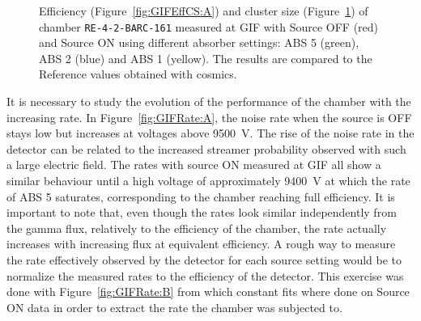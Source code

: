 \begin{figure}[H]
\begin{subfigure}{0.5\linewidth}
        	\caption{\label{fig:GIFEffCS:B}}
    	\end{subfigure}
		\caption{\label{fig:GIFEffCS} Efficiency (Figure~\ref{fig:GIFEffCS:A}) and cluster size (Figure~\ref{fig:GIFEffCS:B}) of chamber \texttt{RE-4-2-BARC-161} measured at GIF with Source OFF (red) and Source ON using different absorber settings: ABS 5 (green), ABS 2 (blue) and ABS 1 (yellow). The results are compared to the Reference values obtained with cosmics.}
	\end{figure}
	
	It is necessary to study the evolution of the performance of the chamber with the increasing rate. In Figure~\ref{fig:GIFRate:A}, the noise rate when the source is OFF stays low but increases at voltages above \SI{9500}{V}. The rise of the noise rate in the detector can be related to the increased streamer probability observed with such a large electric field. The rates with source ON measured at GIF all show a similar behaviour until a high voltage of approximately \SI{9400}{V} at which the rate of ABS 5 saturates, corresponding to the chamber reaching full efficiency. It is important to note that, even though the rates look similar independently from the gamma flux, relatively to the efficiency of the chamber, the rate actually increases with increasing flux at equivalent efficiency. A rough way to measure the rate effectively observed by the detector for each source setting would be to normalize the measured rates to the efficiency of the detector. This exercise was done with Figure~\ref{fig:GIFRate:B} from which constant fits where done on Source ON data in order to extract the rate the chamber was subjected to.
	
